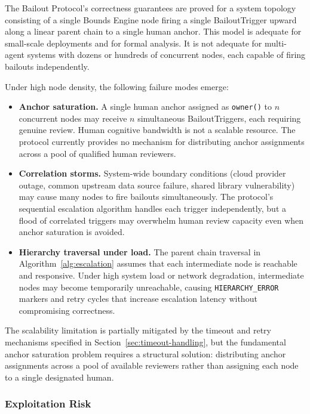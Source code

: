 The Bailout Protocol's correctness guarantees are proved for a system topology consisting of a single Bounds Engine node firing a single BailoutTrigger upward along a linear parent chain to a single human anchor. This model is adequate for small-scale deployments and for formal analysis. It is not adequate for multi-agent systems with dozens or hundreds of concurrent nodes, each capable of firing bailouts independently.

Under high node density, the following failure modes emerge:

\begin{itemize}\setlength\itemsep{0.25em}
\item \textbf{Anchor saturation.} A single human anchor assigned as \texttt{owner()} to $n$ concurrent nodes may receive $n$ simultaneous BailoutTriggers, each requiring genuine review. Human cognitive bandwidth is not a scalable resource. The protocol currently provides no mechanism for distributing anchor assignments across a pool of qualified human reviewers.
\item \textbf{Correlation storms.} System-wide boundary conditions (cloud provider outage, common upstream data source failure, shared library vulnerability) may cause many nodes to fire bailouts simultaneously. The protocol's sequential escalation algorithm handles each trigger independently, but a flood of correlated triggers may overwhelm human review capacity even when anchor saturation is avoided.
\item \textbf{Hierarchy traversal under load.} The parent chain traversal in Algorithm~\ref{alg:escalation} assumes that each intermediate node is reachable and responsive. Under high system load or network degradation, intermediate nodes may become temporarily unreachable, causing \texttt{HIERARCHY\_ERROR} markers and retry cycles that increase escalation latency without compromising correctness.
\end{itemize}

The scalability limitation is partially mitigated by the timeout and retry mechanisms specified in Section~\ref{sec:timeout-handling}, but the fundamental anchor saturation problem requires a structural solution: distributing anchor assignments across a pool of available reviewers rather than assigning each node to a single designated human.

\subsubsection{Exploitation Risk}\label{sec:exploitation-risk}


